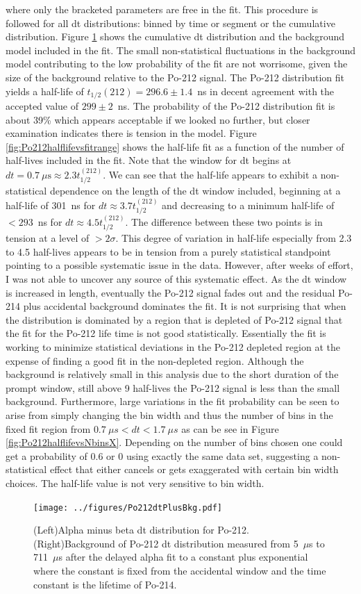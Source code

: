 where only the bracketed parameters are free in the fit. This procedure is followed for all dt distributions: binned by time or segment or the cumulative distribution. Figure \ref{fig:Po212dtplusbkg} shows the cumulative dt distribution and the background model included in the fit. The small non-statistical fluctuations in the background model contributing to the low probability of the fit are not worrisome, given the size of the background relative to the Po-212 signal. The Po-212 distribution fit yields a half-life of $t_{1/2}(212)=296.6\pm1.4$~ns in decent agreement with the accepted value of $299\pm2$~ns.  The probability of the Po-212 distribution fit is about 39\% which appears acceptable if we looked no further, but closer examination indicates there is tension in the model. Figure \ref{fig:Po212halflifevsfitrange} shows the half-life fit as a function of the number of half-lives included in the fit. Note that the window for dt begins at $dt=0.7~\mu\textrm{s}\approx2.3t_{1/2}^{(212)}$. We can see that the half-life appears to exhibit a non-statistical dependence on the length of the dt window included, beginning at a half-life of 301~ns for $dt\approx3.7t_{1/2}^{(212)}$ and decreasing to a minimum half-life of $<293$~ns for $dt\approx4.5t_{1/2}^{(212)}$. The difference between these two points is in tension at a level of $>2\sigma$. This degree of variation in half-life especially from 2.3 to 4.5 half-lives appears to be in tension from a purely statistical standpoint pointing to a possible systematic issue in the data. However, after weeks of effort, I was not able to uncover any source of this systematic effect. As the dt window is increased in length, eventually the Po-212 signal fades out and the residual Po-214 plus accidental background dominates the fit. It is not surprising that when the distribution is dominated by a region that is depleted of Po-212 signal that the fit for the Po-212 life time is not good statistically. Essentially the fit is working to minimize statistical deviations in the Po-212 depleted region at the expense of finding a good fit in the non-depleted region. Although the background is relatively small in this analysis due to the short duration of the prompt window, still above 9 half-lives the Po-212 signal is less than the small background. Furthermore, large variations in the fit probability can be seen to arise from simply changing the bin width and thus the number of bins in the fixed fit region from $0.7~\mu s<dt<1.7~\mu s$ as can be see in Figure \ref{fig:Po212halflifevsNbinsX}. Depending on the number of bins chosen one could get a probability of 0.6 or 0 using exactly the same data set, suggesting a non-statistical effect that either cancels or gets exaggerated with certain bin width choices. The half-life value is not very sensitive to bin width. 
\begin{figure}[!ht]
\centering
\texttt{[image: ../figures/Po212dtPlusBkg.pdf]}
\caption{\label{fig:Po212dtplusbkg}(Left)Alpha minus beta dt distribution for Po-212. (Right)Background of Po-212 dt distribution measured from 5~$\mu$s to 711~$\mu$s after the delayed alpha fit to a constant plus exponential where the constant is fixed from the accidental window and the time constant is the lifetime of Po-214.}
\end{figure}

